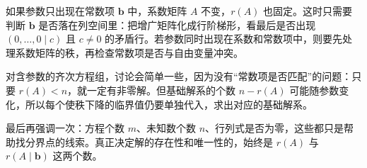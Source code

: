如果参数只出现在常数项 \(\bm{b}\) 中，系数矩阵 \(A\) 不变，\(r(A)\) 也固定。这时只需要判断 \(\bm{b}\) 是否落在列空间里：把增广矩阵化成行阶梯形，看最后是否出现 \((0,\ldots,0\mid c)\) 且 \(c\neq 0\) 的矛盾行。若参数同时出现在系数和常数项中，则要先处理系数矩阵的秩，再检查常数项是否与自由变量冲突。

对含参数的齐次方程组，讨论会简单一些，因为没有“常数项是否匹配”的问题：只要 \(r(A)<n\)，就一定有非零解。但基础解系的个数 \(n-r(A)\) 可能随参数变化，所以每个使秩下降的临界值仍要单独代入，求出对应的基础解系。

最后再强调一次：方程个数 \(m\)、未知数个数 \(n\)、行列式是否为零，这些都只是帮助找分界点的线索。真正决定解的存在性和唯一性的，始终是 \(r(A)\) 与 \(r(A\mid \bm{b})\) 这两个数。

\newpage

